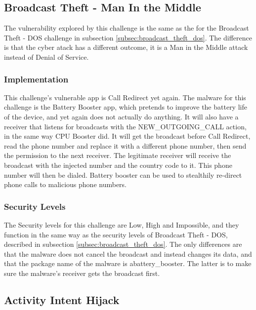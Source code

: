     \subsection{Broadcast Theft - Man In the Middle}
        \label{subsec:broadcast_theft_mitm}
        
    The vulnerability explored by this challenge is the same as the for the Broadcast Theft - DOS challenge in subsection \ref{subsec:broadcast_theft_dos}. The difference is that the cyber atack has a different outcome, it is a Man in the Middle attack instead of Denial of Service.
    
    \subsubsection{Implementation}
        \label{subsubsec:broadcast_theft_mitm_implementation}

    This challenge's vulnerable app is Call Redirect yet again. The malware for this challenge is the Battery Booster app, which pretends to improve the battery life of the device, and yet again does not actually do anything. It will also have a receiver that listens for broadcasts with the NEW\_OUTGOING\_CALL action, in the same way CPU Booster did. It will get the broadcast before Call Redirect, read the phone number and replace it with a different phone number, then send the permission to the next receiver. The legitimate receiver will receive the broadcast with the injected number and the country code to it. This phone number will then be dialed. Battery booster can be used to stealthily re-direct phone calls to malicious phone numbers.
    
    \subsubsection{Security Levels}
        \label{subsubsec:broadcast_theft_mitm_security_levels}
        
    The Security levels for this challenge are Low, High and Impossible, and they function in the same way as the security levels of Broadcast Theft - DOS, described in subsection \ref{subsec:broadcast_theft_dos}. The only differences are that the malware does not cancel the broadcast and instead changes its data, and that the package name of the malware is abattery\_booster. The latter is to make sure the malware's receiver gets the broadcast first.
    
    \subsection{Activity Intent Hijack}
        \label{subsec:activity_hijacking}
        
